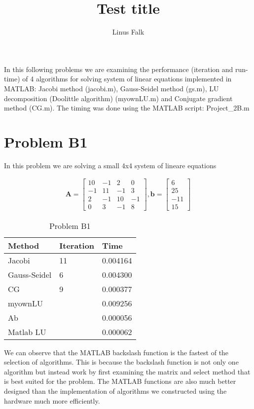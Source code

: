 \documentclass[a4paper]{article}
\title{Test title}
\author{Linus Falk}
\begin{document}
\maketitle
In this following problems we are examining the performance (iteration and run-time) of 4 algorithms for solving system of linear equations implemented in MATLAB: Jacobi method (jacobi.m), Gauss-Seidel method (gs.m), LU decomposition (Doolittle algorithm) (myownLU.m) and Conjugate gradient method (CG.m). The timing was done using the MATLAB script: Project\_2B.m  

\section*{Problem B1}
In this problem we are solving a small 4x4 system of lineare equations

\begin{equation}
\begin{aligned}
\textbf{A}= \begin{bmatrix} 10& -1& 2& 0\\-1& 11& -1& 3 \\2& -1& 10& -1 \\0& 3& -1& 8  \end{bmatrix}, \textbf{b}= \begin{bmatrix} 6 \\25 \\ -11\\ 15 \end{bmatrix}
\end{aligned}
\end{equation}

\begin{table}[ht!]
\centering
\begin{tabular}{lll}
 \textbf{Method}& \textbf{Iteration}  &\textbf{Time}\\ \hline
 Jacobi&  11& 0.004164 \\
 Gauss-Seidel&  6& 0.004300 \\ 
 CG& 9&  0.000377\\
myownLU& & 0.009256\\
Ab& & 0.000056\\
Matlab LU& & 0.000062\\\hline
\end{tabular}
\caption{Problem B1}
\label{tab:tab1}
\end{table}


We can observe that the MATLAB backslash function is the fastest of the selection of algorithms. This is because the backslash function is not only one algorithm but instead work by first examining the matrix and select method that is best suited for the problem. The MATLAB functions are also much better designed than the implementation of algorithms we constructed using the hardware much more efficiently.
\end{document}
